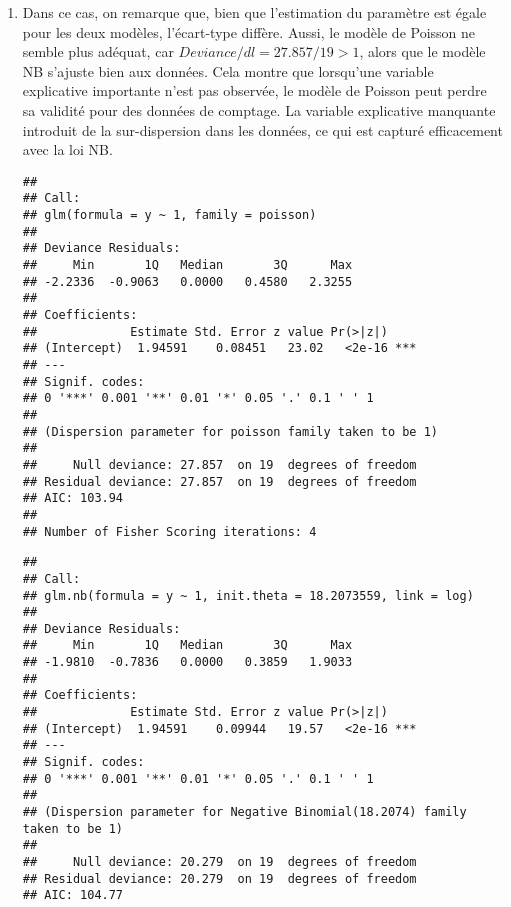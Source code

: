 \begin{solution}{6.4}
\begin{enumerate}
\item Dans ce cas, on remarque que, bien que l'estimation du paramètre est égale pour les deux modèles, l'écart-type diffère. Aussi, le modèle de Poisson ne semble plus adéquat, car $Deviance/dl=27.857/19>1$, alors que le modèle NB s'ajuste bien aux données. Cela montre que lorsqu'une variable explicative importante n'est pas observée, le modèle de Poisson peut perdre sa validité pour des données de comptage. La variable explicative manquante introduit de la sur-dispersion dans les données, ce qui est capturé efficacement avec la loi NB.
\begin{knitrout}
\color{fgcolor}\begin{kframe}
\begin{alltt}
 \hlkwb{<-} \hlopt{~}\hlstd{,}
 \hlkwb{<-} \hlopt{~}\hlstd{)}
\end{alltt}
\begin{verbatim}
##
## Call:
## glm(formula = y ~ 1, family = poisson)
##
## Deviance Residuals:
##     Min       1Q   Median       3Q      Max
## -2.2336  -0.9063   0.0000   0.4580   2.3255
##
## Coefficients:
##             Estimate Std. Error z value Pr(>|z|)
## (Intercept)  1.94591    0.08451   23.02   <2e-16 ***
## ---
## Signif. codes:
## 0 '***' 0.001 '**' 0.01 '*' 0.05 '.' 0.1 ' ' 1
##
## (Dispersion parameter for poisson family taken to be 1)
##
##     Null deviance: 27.857  on 19  degrees of freedom
## Residual deviance: 27.857  on 19  degrees of freedom
## AIC: 103.94
##
## Number of Fisher Scoring iterations: 4
\end{verbatim}
\begin{alltt}
\end{alltt}
\begin{verbatim}
##
## Call:
## glm.nb(formula = y ~ 1, init.theta = 18.2073559, link = log)
##
## Deviance Residuals:
##     Min       1Q   Median       3Q      Max
## -1.9810  -0.7836   0.0000   0.3859   1.9033
##
## Coefficients:
##             Estimate Std. Error z value Pr(>|z|)
## (Intercept)  1.94591    0.09944   19.57   <2e-16 ***
## ---
## Signif. codes:
## 0 '***' 0.001 '**' 0.01 '*' 0.05 '.' 0.1 ' ' 1
##
## (Dispersion parameter for Negative Binomial(18.2074) family taken to be 1)
##
##     Null deviance: 20.279  on 19  degrees of freedom
## Residual deviance: 20.279  on 19  degrees of freedom
## AIC: 104.77

\end{verbatim}
\end{kframe}
\end{knitrout}
\end{enumerate}
\end{solution}
